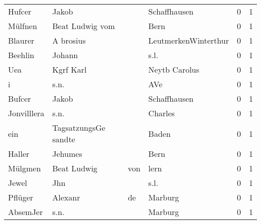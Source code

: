 \begin{tabular}{llllrr}
                   Hufcer &                              Jakob &             &                                Schaffhausen &          0 &         1 \\
                  Mülfnen &                    Beat Ludwig vom &             &                                        Bern &          0 &         1 \\
                  Blaurer &                          A brosius &             &                        LeutmerkenWinterthur &          0 &         1 \\
                  Beehlin &                             Johann &             &                                        s.l. &          0 &         1 \\
                      Uea &                          Kgrf Karl &             &                               Neytb Carolus &          0 &         1 \\
                        i &                               s.n. &             &                                         AVe &          0 &         1 \\
                   Bufcer &                              Jakob &             &                                Schaffhausen &          0 &         1 \\
              Jonvilllera &                               s.n. &             &                                     Charles &          0 &         1 \\
                      ein &               TagsatzungsGe sandte &             &                                       Baden &          0 &         1 \\
                   Haller &                            Jehumes &             &                                        Bern &          0 &         1 \\
                  Mülgmen &                        Beat Ludwig &         von &                                        lern &          0 &         1 \\
                    Jewel &                                Jhn &             &                                        s.l. &          0 &         1 \\
                  Pflüger &                            Alexanr &          de &                                     Marburg &          0 &         1 \\
                 AbsemJer &                               s.n. &             &                                     Marburg &          0 &         1 \\

\end{tabular}
